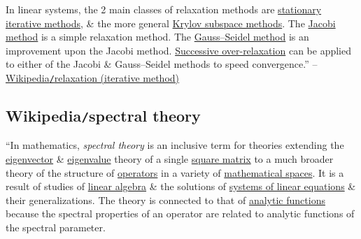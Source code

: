 \documentclass{article}
\begin{document}
In linear systems, the 2 main classes of relaxation methods are \href{https://en.wikipedia.org/wiki/Iterative_method#Stationary_iterative_methods}{stationary iterative methods}, \& the more general \href{https://en.wikipedia.org/wiki/Iterative_method#Krylov_subspace_methods}{Krylov subspace methods}. The \href{https://en.wikipedia.org/wiki/Jacobi_method}{Jacobi method} is a simple relaxation method. The \href{https://en.wikipedia.org/wiki/Gauss%E2%80%93Seidel_method}{Gauss--Seidel method} is an improvement upon the Jacobi method. \href{https://en.wikipedia.org/wiki/Successive_over-relaxation}{Successive over-relaxation} can be applied to either of the Jacobi \& Gauss--Seidel methods to speed convergence.'' -- \href{https://en.wikipedia.org/wiki/Relaxation_(iterative_method)}{Wikipedia{\tt/}relaxation (iterative method)}


\subsection{Wikipedia{\tt/}spectral theory}
``In mathematics, {\it spectral theory} is an inclusive term for theories extending the \href{https://en.wikipedia.org/wiki/Eigenvector}{eigenvector} \& \href{https://en.wikipedia.org/wiki/Eigenvalue}{eigenvalue} theory of a single \href{https://en.wikipedia.org/wiki/Square_matrix}{square matrix} to a much broader theory of the structure of \href{https://en.wikipedia.org/wiki/Operator_(mathematics)}{operators} in a variety of \href{https://en.wikipedia.org/wiki/Mathematical_space}{mathematical spaces}. It is a result of studies of \href{https://en.wikipedia.org/wiki/Linear_algebra}{linear algebra} \& the solutions of \href{https://en.wikipedia.org/wiki/System_of_linear_equations}{systems of linear equations} \& their generalizations. The theory is connected to that of \href{https://en.wikipedia.org/wiki/Analytic_functions}{analytic functions} because the spectral properties of an operator are related to analytic functions of the spectral parameter.
\end{document}
